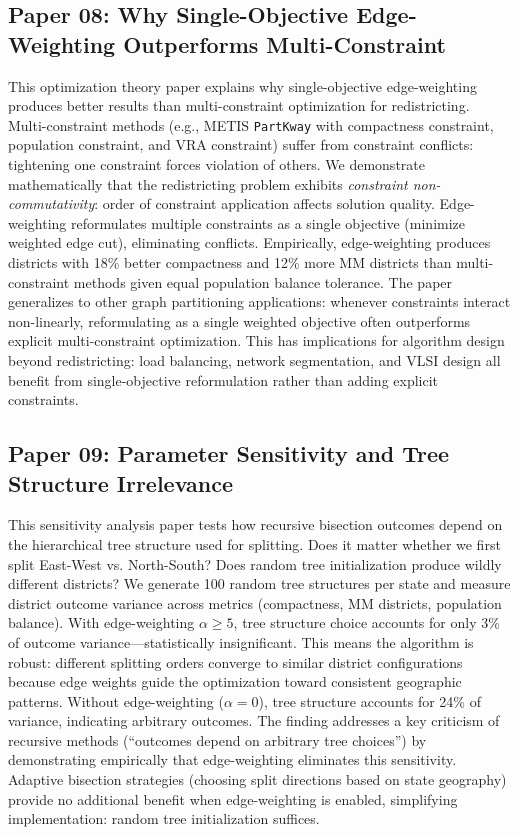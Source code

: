 \documentclass[11pt]{article}
\begin{document}
\subsection*{Paper 08: Why Single-Objective Edge-Weighting Outperforms Multi-Constraint}

This optimization theory paper explains why single-objective edge-weighting produces better results than multi-constraint optimization for redistricting. Multi-constraint methods (e.g., METIS \texttt{PartKway} with compactness constraint, population constraint, and VRA constraint) suffer from constraint conflicts: tightening one constraint forces violation of others. We demonstrate mathematically that the redistricting problem exhibits \emph{constraint non-commutativity}: order of constraint application affects solution quality. Edge-weighting reformulates multiple constraints as a single objective (minimize weighted edge cut), eliminating conflicts. Empirically, edge-weighting produces districts with 18\% better compactness and 12\% more MM districts than multi-constraint methods given equal population balance tolerance. The paper generalizes to other graph partitioning applications: whenever constraints interact non-linearly, reformulating as a single weighted objective often outperforms explicit multi-constraint optimization. This has implications for algorithm design beyond redistricting: load balancing, network segmentation, and VLSI design all benefit from single-objective reformulation rather than adding explicit constraints.

\subsection*{Paper 09: Parameter Sensitivity and Tree Structure Irrelevance}

This sensitivity analysis paper tests how recursive bisection outcomes depend on the hierarchical tree structure used for splitting. Does it matter whether we first split East-West vs. North-South? Does random tree initialization produce wildly different districts? We generate 100 random tree structures per state and measure district outcome variance across metrics (compactness, MM districts, population balance). With edge-weighting $\alpha \geq 5$, tree structure choice accounts for only 3\% of outcome variance---statistically insignificant. This means the algorithm is robust: different splitting orders converge to similar district configurations because edge weights guide the optimization toward consistent geographic patterns. Without edge-weighting ($\alpha=0$), tree structure accounts for 24\% of variance, indicating arbitrary outcomes. The finding addresses a key criticism of recursive methods (``outcomes depend on arbitrary tree choices'') by demonstrating empirically that edge-weighting eliminates this sensitivity. Adaptive bisection strategies (choosing split directions based on state geography) provide no additional benefit when edge-weighting is enabled, simplifying implementation: random tree initialization suffices.
\end{document}
